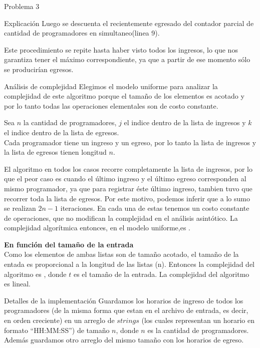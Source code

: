 \begin{section}{Problema 3}
\begin{subsection}{Explicación}
Luego se descuenta el recientemente egresado del contador parcial de cantidad de programadores en simultaneo(linea 9).

Este procedimiento se repite hasta haber visto todos los ingresos, lo que nos garantiza tener el máximo correspondiente, ya que a partir de ese momento sólo se producirían egresos.

		\begin{subsubsection}{Análisis de complejidad}
			Elegimos el modelo uniforme para analizar la complejidad de este algoritmo porque el tamaño de los elementos es acotado y por lo tanto todas las operaciones elementales son de costo constante.\Pa
			
			Sea $n$ la cantidad de programadores, $j$ el indice dentro de la lista de ingresos y $k$ el indice dentro de la lista de egresos.\\
			
			
			Cada programador tiene un ingreso y un egreso, por lo tanto la lista de ingresos y la lista de egresos tienen longitud $n$.

El algoritmo en todos los casos recorre completamente la lista de ingresos, por lo que el peor caso es cuando el último ingreso y el último egreso corresponden al mismo programador, ya que para registrar éste último ingreso, tambien tuvo que recorrer toda la lista de egresos. Por este motivo, podemos inferir que a lo sumo se realizan $2n -1$ iteraciones. En cada una de estas tenemos un costo constante de operaciones, que no modifican la complejidad en el análisis asintótico. La complejidad algorítmica entonces, en el modelo uniforme,es .\VSP

		\noindent\textbf{En función del tamaño de la entrada}\\

			Como los elementos de ambas listas son de tamaño acotado, el tamaño de la entada es proporcional a la longitud de las listas (n). Entonces la complejidad del algoritmo es , donde $t$ es el tamaño de la entrada. La complejidad del algoritmo es lineal.

		\end{subsubsection}

	\end{subsection}

	\begin{subsection}{Detalles de la implementación}
	Guardamos los horarios de ingreso de todos los programadores (de la misma forma que estan en el archivo de entrada, es decir, en orden creciente) en un arreglo de $strings$ (los cuales representan un horario en formato ``HH:MM:SS'') de tamaño $n$, donde $n$ es la cantidad de programadores. Además guardamos otro arreglo del mismo tamaño con los horarios de egreso.
	

\end{subsection}
\end{section}
